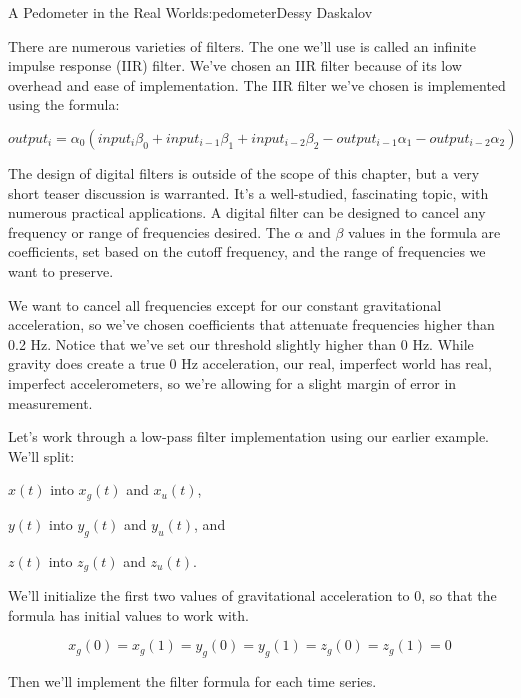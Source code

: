 \begin{aosachapter}{A Pedometer in the Real World}{s:pedometer}{Dessy Daskalov}

There are numerous varieties of filters. The one we'll use is called an
infinite impulse response (IIR) filter. We've chosen an IIR filter
because of its low overhead and ease of implementation. The IIR filter
we've chosen is implemented using the formula:

\[
output_{i} = \alpha_{0}(input_{i}\beta_{0} + input_{i-1}\beta_{1} + input_{i-2}\beta_{2} - output_{i-1}\alpha_{1} - output_{i-2}\alpha_{2})
\]

The design of digital filters is outside of the scope of this chapter,
but a very short teaser discussion is warranted. It's a well-studied,
fascinating topic, with numerous practical applications. A digital
filter can be designed to cancel any frequency or range of frequencies
desired. The $\alpha$ and $\beta$ values in the formula are
coefficients, set based on the cutoff frequency, and the range of
frequencies we want to preserve.

We want to cancel all frequencies except for our constant gravitational
acceleration, so we've chosen coefficients that attenuate frequencies
higher than 0.2 Hz. Notice that we've set our threshold slightly higher
than 0 Hz. While gravity does create a true 0 Hz acceleration, our real,
imperfect world has real, imperfect accelerometers, so we're allowing
for a slight margin of error in measurement.

\label{implementing-a-low-pass-filter}

Let's work through a low-pass filter implementation using our earlier
example. We'll split:

\begin{aosaitemize}

\item
  $x(t)$ into $x_{g}(t)$ and $x_{u}(t)$,
\item
  $y(t)$ into $y_{g}(t)$ and $y_{u}(t)$, and
\item
  $z(t)$ into $z_{g}(t)$ and $z_{u}(t)$.
\end{aosaitemize}

We'll initialize the first two values of gravitational acceleration to
0, so that the formula has initial values to work with.

\[x_{g}(0) = x_{g}(1) = y_{g}(0) = y_{g}(1) = z_{g}(0) = z_{g}(1) = 0\]

Then we'll implement the filter formula for each time series.


\end{aosachapter}
